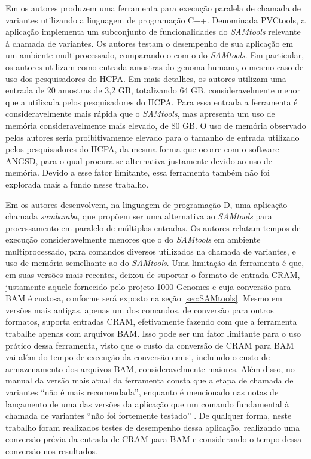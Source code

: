 \documentclass[cic,tc]{iiufrgs}
\begin{document}
Em \cite{jin2019pvctools} os autores produzem uma ferramenta para execução
paralela de chamada de variantes utilizando a linguagem de programação C++.
Denominada PVCtools, a aplicação implementa um subconjunto de funcionalidades
do \textit{SAMtools} relevante à chamada de variantes. Os autores testam o desempenho de
sua aplicação em um ambiente multiprocessado, comparando-o com o do \textit{SAMtools}.
Em particular, os autores utilizam como entrada amostras do genoma humano,
o mesmo caso de uso dos pesquisadores do HCPA. Em mais detalhes, os
autores utilizam uma entrada de 20 amostras de 3,2 GB, totalizando 64 GB,
consideravelmente menor que a utilizada pelos pesquisadores do HCPA. Para essa
entrada a ferramenta é consideravelmente mais rápida que o \textit{SAMtools}, mas
apresenta um uso de memória consideravelmente mais elevado, de 80 GB. O uso de
memória observado pelos autores seria proibitivamente elevado para o tamanho de
entrada utilizado pelos pesquisadores do HCPA, da mesma forma que ocorre com o
software ANGSD, para o qual procura-se alternativa justamente devido ao uso
de memória. Devido a esse fator limitante, essa ferramenta também não foi
explorada mais a fundo nesse trabalho.

Em \cite{tarasov2015sambamba} os autores desenvolvem, na linguagem de
programação D, uma aplicação chamada \textit{sambamba}, que propõem ser uma alternativa
ao \textit{SAMtools} para processamento em paralelo de múltiplas entradas. Os autores
relatam tempos de execução consideravelmente menores que o do \textit{SAMtools} em
ambiente multiprocessado, para comandos diversos utilizados na chamada de
variantes, e uso de memória semelhante ao do \textit{SAMtools}. Uma limitação da
ferramenta é que, em suas versões mais recentes, deixou de suportar o formato
de entrada CRAM, justamente aquele fornecido pelo projeto 1000 Genomes e cuja
conversão para BAM é custosa, conforme será exposto na seção
\ref{sec:SAMtools}. Mesmo em versões mais antigas, apenas um dos comandos, de
conversão para outros formatos, suporta entradas CRAM, efetivamente fazendo com
que a ferramenta trabalhe apenas com arquivos BAM. Isso pode ser um fator
limitante para o uso prático dessa ferramenta, visto que o custo da conversão
de CRAM para BAM vai além do tempo de execução da conversão em si, incluindo o
custo de armazenamento dos arquivos BAM, consideravelmente maiores. Além disso,
no manual da versão mais atual da ferramenta consta que a etapa de chamada de
variantes ``não é mais recomendada'', enquanto é mencionado nas notas de
lançamento de uma das versões da aplicação que um comando fundamental à chamada
de variantes ``não foi fortemente testado'' \cite{manual2015sambamba}. De
qualquer forma, neste trabalho foram realizados testes de desempenho dessa
aplicação, realizando uma conversão prévia da entrada de CRAM para BAM e
considerando o tempo dessa conversão nos resultados.
\end{document}
